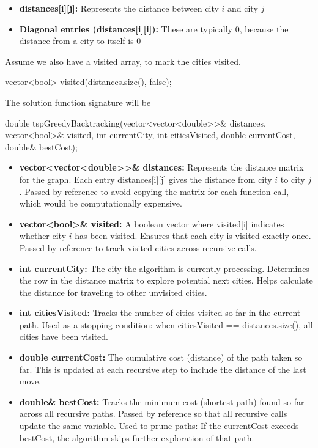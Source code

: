 \documentclass{report}
\begin{document}
\begin{itemize}
    \item \textbf{distances[i][j]:} Represents the distance between city $i$ and city $j$
    \item \textbf{Diagonal entries (distances[i][i]):} These are typically 0, because the distance from a city to itself is 0
\end{itemize}
\bigbreak \noindent 
Assume we also have a visited array, to mark the cities visited.
\bigbreak \noindent 
\begin{cppcode}
    vector<bool> visited(distances.size(), false);
\end{cppcode}
\bigbreak \noindent 
The solution function signature will be 
\bigbreak \noindent 
\begin{cppcode}
double tspGreedyBacktracking(vector<vector<double>>& distances, vector<bool>& visited, int currentCity, int citiesVisited, double currentCost, double& bestCost);
\end{cppcode}
\bigbreak \noindent 
\begin{itemize}
    \item \textbf{vector<vector<double>>\& distances:} Represents the distance matrix for the graph. Each entry distances[i][j] gives the distance from city $i$ to city $j$.
        \bigbreak \noindent 
        Passed by reference to avoid copying the matrix for each function call, which would be computationally expensive.
\item \textbf{vector<bool>\& visited:} A boolean vector where visited[i] indicates whether city $i$ has been visited. Ensures that each city is visited exactly once. Passed by reference to track visited cities across recursive calls.
\item \textbf{int currentCity:} The city the algorithm is currently processing. Determines the row in the distance matrix to explore potential next cities. Helps calculate the distance for traveling to other unvisited cities.
\item \textbf{int citiesVisited:} Tracks the number of cities visited so far in the current path. Used as a stopping condition: when citiesVisited == distances.size(), all cities have been visited.
\item \textbf{double currentCost:} The cumulative cost (distance) of the path taken so far. This is updated at each recursive step to include the distance of the last move.
\item \textbf{double\& bestCost:} Tracks the minimum cost (shortest path) found so far across all recursive paths. Passed by reference so that all recursive calls update the same variable. Used to prune paths: If the currentCost exceeds bestCost, the algorithm skips further exploration of that path.
\end{itemize}
\end{document}
